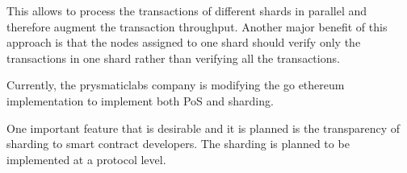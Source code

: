 This allows to process the transactions of different shards in parallel
and therefore augment the transaction throughput. Another major benefit of this
approach is that the nodes assigned to one shard should verify only the
transactions in one shard rather than verifying all the transactions.




Currently, the prysmaticlabs company is modifying the go ethereum implementation
to implement both PoS and sharding.

One important feature that is desirable and it is planned is the transparency
of sharding to smart contract developers. The sharding is planned to be
implemented at a protocol level.



